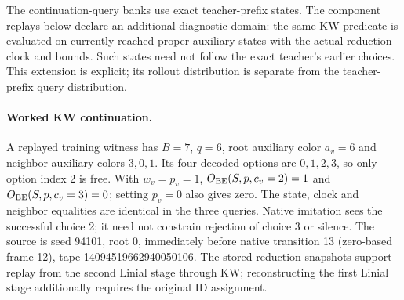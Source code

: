 The continuation-query banks use exact teacher-prefix states. The component
replays below declare an additional diagnostic domain: the same KW predicate
is evaluated on currently reached proper auxiliary states with the actual
reduction clock and bounds. Such states need not follow the exact teacher's
earlier choices. This extension is explicit; its rollout distribution is
separate from the teacher-prefix query distribution.

\paragraph{Worked KW continuation.}
A replayed training witness has $B=7$, $q=6$, root auxiliary color $a_v=6$
and neighbor auxiliary colors $3,0,1$. Its four decoded options are
$0,1,2,3$, so only option index 2 is free. With $w_v=p_v=1$,
$O_{\rm BE}(S,p,c_v=2)=1$ and $O_{\rm BE}(S,p,c_v=3)=0$; setting $p_v=0$
also gives zero. The state, clock and neighbor equalities are identical in
the three queries. Native imitation sees the successful choice 2; it need
not constrain rejection of choice 3 or silence. The source is seed 94101,
root 0, immediately before native transition 13 (zero-based frame 12),
tape 14094519662940050106. The stored reduction snapshots support replay
from the second Linial stage through KW; reconstructing the first Linial
stage additionally requires the original ID assignment.
